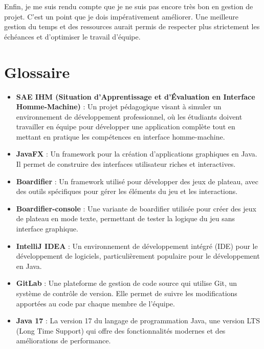 Enfin, je me suis rendu compte que je ne suis pas encore très bon en gestion de projet. C'est un point que je dois impérativement améliorer. Une meilleure gestion du temps et des ressources aurait permis de respecter plus strictement les échéances et d'optimiser le travail d'équipe.

\chapter{Glossaire}
\setcounter{page}{1}
\renewcommand{\thepage}{\Roman{page}}

\begin{itemize}
    \label{sae-ihm}
    \item \textbf{SAE IHM (Situation d'Apprentissage et d'Évaluation en Interface Homme-Machine)} : Un projet pédagogique visant à simuler un environnement de développement professionnel, où les étudiants doivent travailler en équipe pour développer une application complète tout en mettant en pratique les compétences en interface homme-machine.

    \item \textbf{JavaFX} : Un framework pour la création d'applications graphiques en Java. Il permet de construire des interfaces utilisateur riches et interactives.

    \item \textbf{Boardifier} : Un framework utilisé pour développer des jeux de plateau, avec des outils spécifiques pour gérer les éléments du jeu et les interactions.

    \item \textbf{Boardifier-console} : Une variante de boardifier utilisée pour créer des jeux de plateau en mode texte, permettant de tester la logique du jeu sans interface graphique.

    \item \textbf{IntelliJ IDEA} : Un environnement de développement intégré (IDE) pour le développement de logiciels, particulièrement populaire pour le développement en Java.

    \item \textbf{GitLab} : Une plateforme de gestion de code source qui utilise Git, un système de contrôle de version. Elle permet de suivre les modifications apportées au code par chaque membre de l'équipe.

    \item \textbf{Java 17} : La version 17 du langage de programmation Java, une version LTS (Long Time Support) qui offre des fonctionnalités modernes et des améliorations de performance.


\end{itemize}
